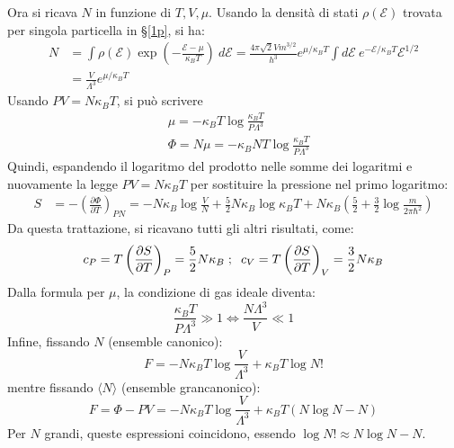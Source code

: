 \documentclass[10pt, a4paper]{scrartcl}
\numberwithin{equation}{subsection}
\theoremstyle{style1}
\begin{document}
Ora si ricava $N$ in funzione di $T,V,\mu $. Usando la densit\`a di stati $\rho (\mathscr{E})$ trovata per singola particella in \S \ref{1p}, si ha:
\begin{equation}
	\begin{split}
		N &= \int \rho (\mathscr{E}) \exp\left(- \frac{\mathscr{E}-\mu }{\kappa _BT}\right) \ d \mathscr{E}= \frac{4\pi \sqrt{2} V m^{ 3 /2 } }{h^3}e^{ \mu  / \kappa _B T} \int d\mathscr{E} \ e^{ - \mathscr{E} / \kappa _B T}  \mathscr{E}^{1 / 2} \\
		  &= \frac{V}{\Lambda ^3}e^{\mu  / \kappa _B T} 
	\end{split}
\end{equation}
Usando $PV = N\kappa _B T$, si pu\`o scrivere
\begin{equation}
	\begin{split}
		&\mu = - \kappa _B T \log \frac{\kappa _B T}{P \Lambda ^3}\\
		&\Phi = N\mu  = - \kappa _B NT \log \frac{\kappa _B T}{P\Lambda ^3}
	\end{split}
\end{equation}
Quindi, espandendo il logaritmo del prodotto nelle somme dei logaritmi e nuovamente la legge $PV = N\kappa _B T$ per sostituire la pressione nel primo logaritmo:
\begin{equation}
	\begin{split}
		S &= - \left(\frac{\partial \Phi}{\partial T} \right) _{PN} = - N\kappa _B \log \frac{V}{N} + \frac{5}{2} N\kappa _B \log\kappa _B T + N\kappa _B \left(\frac{5}{2} + \frac{3}{2} \log \frac{m}{2\pi\hbar ^2}\right) 
	\end{split}
\end{equation}
Da questa trattazione, si ricavano tutti gli altri risultati, come:
\[
c_P = T \left(\frac{\partial S}{\partial T} \right) _P =  \frac{5}{2}N\kappa _B \hspace{.1cm} ; \hspace{.2cm} c_V = T \left(\frac{\partial S}{\partial T} \right) _V = \frac{3}{2} N \kappa _B 
\] 
Dalla formula per $\mu $, la condizione di gas ideale diventa:
\begin{equation}
	\frac{\kappa _B  T}{P\Lambda ^3}  \gg 1 \iff \frac{N\Lambda ^3}{V}\ll 1
\end{equation}
Infine, fissando $N$ (ensemble canonico):
\begin{equation}
	F = -N\kappa _BT \log \frac{V}{\Lambda ^3}  + \kappa _BT \log N!
\end{equation}
mentre fissando $\langle N \rangle$ (ensemble grancanonico):
\begin{equation}
	F = \Phi - PV = - N\kappa _B T  \log \frac{V}{\Lambda ^3} + \kappa _B T (N \log N - N)
\end{equation}
Per $N$ grandi, queste espressioni coincidono, essendo $\log N! \approx N \log N - N$.
\end{document}
